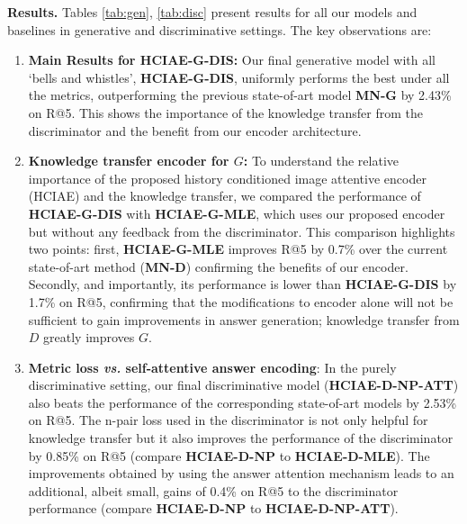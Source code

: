 \documentclass{article}
\newcommand{\ourenc}{HCIAE\xspace}
\begin{document}
\textbf{Results.} 
Tables \ref{tab:gen}, \ref{tab:disc} present results for all our models and baselines in generative and discriminative settings. 
The key observations are: 
\begin{enumerate}
\item {\bf Main Results for \ourenc-G-DIS:} Our final generative model with all `bells and whistles', \textbf{\ourenc-G-DIS}, 
uniformly performs the best under all the metrics, outperforming the previous state-of-art model \textbf{MN-G} by 2.43\% on R@5. 
This shows the importance of the knowledge transfer from the discriminator and the benefit from our encoder architecture. 

\item {\bf Knowledge transfer \vs encoder for $G$:} To understand the relative importance of the proposed history 
conditioned image attentive encoder (\ourenc) and the knowledge transfer, we compared the performance of \textbf{\ourenc-G-DIS} 
with \textbf{\ourenc-G-MLE}, 
which uses our proposed encoder but without any feedback from the discriminator. 
This comparison highlights two points: first, \textbf{\ourenc-G-MLE} improves R@5 by 0.7\% over the current 
state-of-art method (\textbf{MN-D}) confirming the benefits of our encoder. Secondly, and importantly,  its performance 
is lower than \textbf{\ourenc-G-DIS} by 1.7\% on R@5, confirming that the modifications to encoder alone will not be sufficient to gain 
improvements in answer generation; knowledge transfer from $D$ greatly improves $G$. 

\item {\bf Metric loss {\it vs.} self-attentive answer encoding}: In the purely discriminative setting, our final discriminative 
model (\textbf{\ourenc-D-NP-ATT}) also beats the performance of the corresponding state-of-art models \cite{visdial} by 2.53\% on R@5. 
The n-pair loss used in the discriminator is not only helpful for knowledge transfer but it also improves the performance 
of the discriminator by 0.85\% on R@5 (compare \textbf{\ourenc-D-NP} to 
\textbf{\ourenc-D-MLE}).
The improvements obtained by using the 
answer attention mechanism leads to an additional, albeit small,
gains of 0.4\%  on R@5 to the discriminator performance (compare \textbf{\ourenc-D-NP} to \textbf{\ourenc-D-NP-ATT}). 
\end{enumerate}
\end{document}
